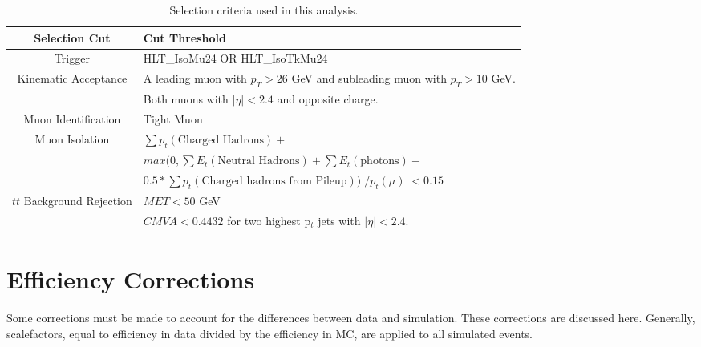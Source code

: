 \documentclass[
    10pt, %
    a4paper, %
    oneside, %
    headinclude,footinclude, %
    BCOR5mm, %
]{scrartcl}
\begin{document}
    \begin{table}[H]
        \centering

        \caption{ Selection criteria used in this analysis.}
        \label{tab:cuts}
        \begin{adjustbox}{width=1\textwidth}
            \begin{tabular}{|| c | l ||}
                \hline
                \textbf{Selection Cut}  & \textbf{Cut Threshold}\\
                \hline \hline
                Trigger & HLT\_IsoMu24 OR HLT\_IsoTkMu24 \\

                \hline

                Kinematic Acceptance & A leading muon with $p_T > 26 $ GeV 
                and subleading muon with $p_T > 10 $ GeV.\\
                & Both muons with $|\eta| < 2.4$ and opposite charge. \\
                \hline
                Muon Identification & Tight Muon \\

                \hline

                Muon Isolation & $\sum p_t (\text{Charged Hadrons}) +$  \\
                & $max(0, \sum E_t (\text{Neutral Hadrons}) + \sum E_t (\text{photons}) - $ \\ 
                &  $0.5 * \sum p_t (\text{Charged hadrons from Pileup}))\; /p_t (\mu) \; < 0.15$ \\

                \hline

                $t\bar{t}$ Background Rejection & $MET < 50$ GeV \\
                & $CMVA < 0.4432$ for two highest p$_t$ jets with $|\eta| < 2.4$.  \\




                \hline

            \end{tabular}
        \end{adjustbox}

    \end{table}

    \section{Efficiency Corrections}
    Some corrections must be made to account for the differences between data and simulation. These corrections are discussed here.
    Generally, scalefactors, equal to efficiency in data divided by the efficiency in MC, are applied to all simulated events. \\
\end{document}
